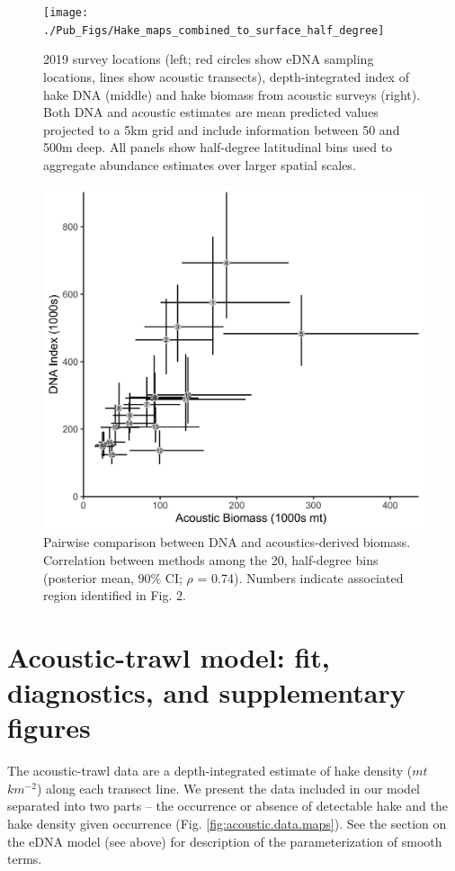 \documentclass[
]{article}
\begin{document}
\begin{figure}
\texttt{[image: ./Pub\_Figs/Hake\_maps\_combined\_to\_surface\_half\_degree]} \caption{\label{fig:surface.compare.half} 2019 survey locations (left; red circles show eDNA sampling locations, lines show acoustic transects), depth-integrated  index of hake DNA (middle) and hake biomass from acoustic surveys (right).  Both DNA and acoustic estimates are mean predicted values projected to a 5km grid and include information between 50 and 500m deep. All panels show half-degree latitudinal bins used to aggregate abundance estimates over larger spatial scales.    }\label{fig:fig.surface.compare.half}
\end{figure}

\begin{figure}
\includegraphics[width=0.6\linewidth]{./Pub_Figs/Hake_DNA-Acoustic_bivariate_correlation_0.5} \caption{\label{fig:pairwise} Pairwise comparison between  DNA and acoustics-derived biomass. Correlation between methods among the 20, half-degree bins (posterior mean, 90\% CI; \( \rho \) = 0.74). Numbers indicate associated region identified in Fig. 2.  }\label{fig:fig.pairwise}
\end{figure}

\newpage
\clearpage

\hypertarget{acoustic-trawl-model-fit-diagnostics-and-supplementary-figures}{%
\section{Acoustic-trawl model: fit, diagnostics, and supplementary
figures}\label{acoustic-trawl-model-fit-diagnostics-and-supplementary-figures}}

The acoustic-trawl data are a depth-integrated estimate of hake density
(\(mt\) \(km^{-2}\)) along each transect line. We present the data
included in our model separated into two parts -- the occurrence or
absence of detectable hake and the hake density given occurrence (Fig.
\ref{fig:acoustic.data.maps}). See the section on the eDNA model (see
above) for description of the parameterization of smooth terms.
\end{document}
